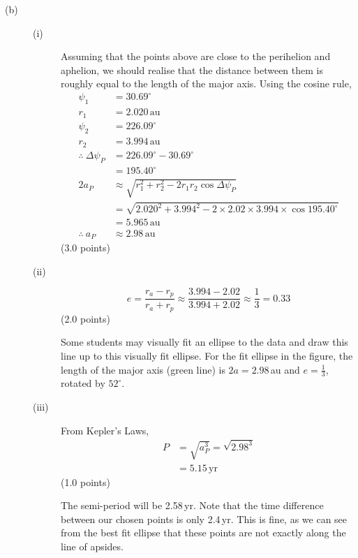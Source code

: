 \begin{description}
\item[(b)]
  \begin{description}
  \item[(i)] Assuming that the points above are close to the perihelion and
    aphelion, we should realise that the distance between them is roughly
    equal to the length of the major axis. Using the cosine rule,
    \begin{align*}
      \psi_1 &= 30.69^\circ \\
      r_1 &= 2.020\,\mathrm{au} \\
      \psi_2 &= 226.09^\circ \\
      r_2 &= 3.994\,\mathrm{au} \\
      \therefore\ \Delta\psi_P &= 226.09^\circ - 30.69^\circ \\
        &= 195.40^\circ \\
      2a_P &\approx \sqrt{r_1^2 + r_2^2 - 2r_1 r_2\cos\Delta\psi_P} \\
        &= \sqrt{2.020^2 + 3.994^2
           - 2\times2.02\times3.994\times\cos195.40^\circ} \\
        &= 5.965\,\mathrm{au} \\
      \therefore\ a_P &\approx 2.98\,\mathrm{au}
    \end{align*}
    \hfill(3.0 points)

  \item[(ii)]
    \[
      e = \frac{r_a - r_p}{r_a + r_p}
        \approx \frac{3.994 - 2.02}{3.994 + 2.02}
        \approx \frac{1}{3} = 0.33
    \]
    \hfill(2.0 points)

    Some students may visually fit an ellipse to the data and draw this line
    up to this visually fit ellipse. For the fit ellipse in the figure, the
    length of the major axis (green line) is $2a = 2.98$\,au and
    $e = \frac{1}{3}$, rotated by $52^\circ$. %

  \item[(iii)] From Kepler's Laws,
    \begin{align*}
      P &= \sqrt{a_P^3} = \sqrt{2.98^3} \\
        &= 5.15\,\mathrm{yr}
    \end{align*}
    \hfill(1.0 points)

    The semi-period will be 2.58\,yr. Note that the time difference between
    our chosen points is only 2.4\,yr. This is fine, as we can see from the
    best fit ellipse that these points are not exactly along the line of
    apsides.


\end{description}
\end{description}
